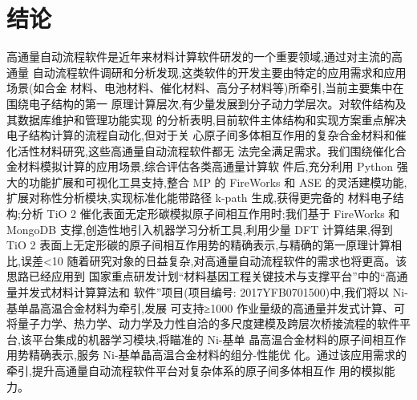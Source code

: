 \chapter{结论}
高通量自动流程软件是近年来材料计算软件研发的一个重要领域,通过对主流的高通量
自动流程软件调研和分析发现,这类软件的开发主要由特定的应用需求和应用场景(如合金
材料、电池材料、催化材料、高分子材料等)所牵引,当前主要集中在围绕电子结构的第一
原理计算层次,有少量发展到分子动力学层次。对软件结构及其数据库维护和管理功能实现
的分析表明,目前软件主体结构和实现方案重点解决电子结构计算的流程自动化,但对于关
心原子间多体相互作用的复杂合金材料和催化活性材料研究,这些高通量自动流程软件都无
法完全满足需求。我们围绕催化合金材料模拟计算的应用场景,综合评估各类高通量计算软
件后,充分利用 Python 强大的功能扩展和可视化工具支持,整合 MP 的 FireWorks 和 ASE
的灵活建模功能,扩展对称性分析模块,实现标准化能带路径 k-path 生成,获得更完备的
材料电子结构;分析 TiO 2 催化表面无定形碳模拟原子间相互作用时;我们基于 FireWorks
和 MongoDB 支撑,创造性地引入机器学习分析工具,利用少量 DFT 计算结果,得到 TiO 2
表面上无定形碳的原子间相互作用势的精确表示,与精确的第一原理计算相比,误差<10%
随着研究对象的日益复杂,对高通量自动流程软件的需求也将更高。该思路已经应用到
国家重点研发计划“材料基因工程关键技术与支撑平台”中的“高通量并发式材料计算算法和
软件”项目(项目编号: 2017YFB0701500)中,我们将以 Ni-基单晶高温合金材料为牵引,发展
可支持≥1000 作业量级的高通量并发式计算、可将量子力学、热力学、动力学及力性自洽的多尺度建模及跨层次桥接流程的软件平台,该平台集成的机器学习模块,将瞄准的 Ni-基单
晶高温合金材料的原子间相互作用势精确表示,服务 Ni-基单晶高温合金材料的组分-性能优
化。通过该应用需求的牵引,提升高通量自动流程软件平台对复杂体系的原子间多体相互作
用的模拟能力。
